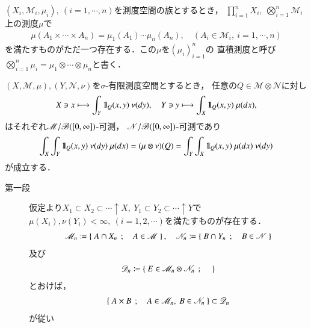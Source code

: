 	\begin{screen}
		\begin{dfn}[直積測度]
			$(X_i,\mathscr{M}_i,\mu_i),\ (i=1,\cdots,n)$を測度空間の族とするとき，
			$\prod_{i=1}^n X_i,\ \bigotimes_{i=1}^n \mathscr{M}_i$上の測度$\mu$で
			\begin{align}
				\mu(A_1 \times \cdots \times A_n)
				= \mu_1(A_1) \cdots \mu_n(A_n),
				\quad (A_i \in \mathscr{M}_i,\ i=1,\cdots,n)
			\end{align}
			を満たすものがただ一つ存在する．この$\mu$を$(\mu_i)_{i=1}^n$の
			直積測度と呼び$\bigotimes_{i=1}^n \mu_i = \mu_1 \otimes \cdots \otimes \mu_n$と書く．
		\end{dfn}
	\end{screen}
	
	\begin{screen}
		\begin{lem}
			$(X,\mathscr{M},\mu),(Y,\mathscr{N},\nu)$を$\sigma$-有限測度空間とするとき，
			任意の$Q \in \mathscr{M} \otimes \mathscr{N}$に対し
			\begin{align}
				X \ni x \longmapsto \int_Y \defunc_{Q}(x,y)\ \nu(dy),
				\quad Y \ni y \longmapsto \int_X \defunc_{Q}(x,y)\ \mu(dx),
			\end{align}
			はそれぞれ$\mathscr{M}/\mathscr{B}([0,\infty])$-可測，
			$\mathscr{N}/\mathscr{B}([0,\infty])$-可測であり
			\begin{align}
				\int_X \int_Y \mbox{1}\hspace{-0.25em}\mbox{l}_Q (x,y)\ \nu(dy)\ \mu(dx)
				= (\mu \otimes \nu)(Q)
				= \int_Y \int_X \mbox{1}\hspace{-0.25em}\mbox{l}_Q (x,y)\ \mu(dx)\ \nu(dy)
			\end{align}
			が成立する．
		\end{lem}
	\end{screen}
	
	\begin{prf}\mbox{}
		\begin{description}
			\item[第一段]
				仮定より$X_1 \subset X_2 \subset \cdots \uparrow X,
				\ Y_1 \subset Y_2 \subset \cdots \uparrow Y$で
				$\mu(X_i),\nu(Y_i) < \infty,\ (i=1,2,\cdots)$を満たすものが存在する．
				\begin{align}
					\mathscr{M}_n \coloneqq \left\{\ A \cap X_n\ \, ; \quad A \in \mathscr{M}\ \right\},
					\quad \mathscr{N}_n \coloneqq \left\{\ B \cap Y_n\ \, ; \quad B \in \mathscr{N}\ \right\}
				\end{align}
				及び
				\begin{align}
					\mathscr{D}_n \coloneqq
					\left\{\ E \in \mathscr{M}_n \otimes \mathscr{N}_n\ \, ; \quad \ \right\} 
				\end{align}
				とおけば，
				\begin{align}
					\left\{\ A \times B\ \, ; \quad A \in \mathscr{M}_n,\ B \in \mathscr{N}_n\ \right\}
					\subset \mathscr{D}_n
				\end{align}
				が従い
		\end{description}
	\end{prf}
	
